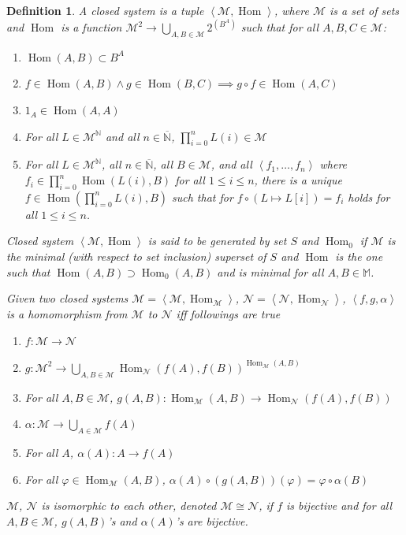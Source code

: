 \documentclass{book}
\newtheorem{definition}{Definition}
\theoremstyle{definition}\newtheorem{mechanism}{Mechanism}
\theoremstyle{remark}\newtheorem*{remark}{Remark}
\DeclareMathOperator*{\Hom}{Hom}
\begin{document}
\begin{definition}
	A closed system is a tuple $\left<\mathcal M, \Hom\right>$, where $\mathcal M$ is a set of sets and $\Hom$ is a function $\mathcal M^2\to \bigcup_{A, B \in \mathcal M} 2^{\left(B^A\right)}$ such that for all $A, B, C \in \mathcal M$:
	
	\begin{enumerate}
		\item $\Hom(A, B)\subset B^A$
		\item $f\in \Hom(A, B)\land g\in \Hom(B, C) \implies g\circ f\in \Hom(A, C)$
		\item $1_A\in \Hom(A, A)$
		\item For all $L\in \mathcal M^{\mathbb N}$ and all $n\in\mathbb \overline{\mathbb N}$, $\prod_{i=0}^{n} L(i) \in \mathcal M$
		\item For all $L\in \mathcal M^{\mathbb N}$, all $n\in\mathbb \overline{\mathbb N}$, all $B\in \mathcal M$, and all $\left<f_1, \dots, f_n\right>$ where $f_i\in \prod_{i=0}^{n} \Hom(L(i), B)$ for all $1\le i\le n$, there is a unique $f\in \Hom(\prod_{i=0}^{n} L(i), B)$ such that for $f\circ(L\mapsto L[i]) = f_i$ holds for all $1\le i\le n$.
	\end{enumerate}
	
	Closed system $\left<\mathcal M, \Hom\right>$ is said to be generated by set $S$ and $\Hom_0$ if $\mathcal M$ is the minimal (with respect to set inclusion) superset of $S$ and $\Hom$ is the one such that $\Hom(A, B)\supset \Hom_0(A, B)$ and is minimal for all $A, B\in\mathbb M$.
	
	Given two closed systems $\mathscr M = \left<\mathcal M, \Hom_{\mathcal M}\right>$, $\mathscr N = \left<\mathcal N, \Hom_{\mathcal N}\right>$, $\left<f, g, \alpha\right>$ is a homomorphism from $\mathscr M$ to $\mathscr N$ iff followings are true
	
	\begin{enumerate}
		\item $f: \mathcal M\to \mathcal N$
		\item $g: \mathcal M^2\to \bigcup_{A, B\in \mathcal M} \Hom_{\mathcal N}(f(A), f(B))^{\Hom_{\mathcal M}(A, B)}$
		\item For all $A, B\in \mathcal M$, $g(A, B): \Hom_{\mathcal M}(A, B) \to \Hom_{\mathcal N}\left(f(A), f(B)\right)$
		\item $\alpha: \mathcal M\to \bigcup_{A\in\mathcal M} f(A)$
		\item For all $A$, $\alpha(A): A\to f(A)$
		\item For all $\varphi\in \Hom_{\mathcal M}(A, B)$, $\alpha(A)\circ (g(A, B))(\varphi) = \varphi\circ \alpha(B)$
	\end{enumerate}
	
	$\mathscr M$, $\mathscr N$ is isomorphic to each other, denoted $\mathscr M\cong \mathscr N$, if $f$ is bijective and for all $A, B\in\mathcal M$, $g(A, B)$'s and $\alpha(A)$'s are bijective.
\end{definition}
\end{document}
